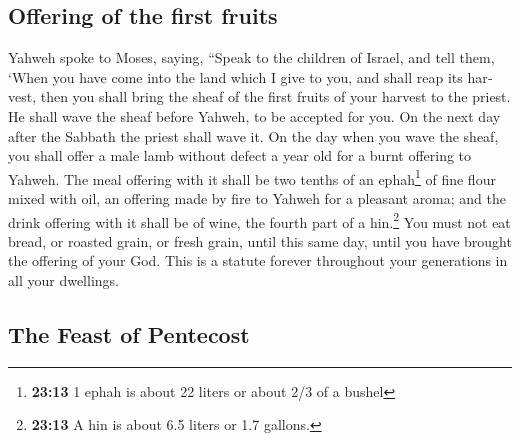 \begin{paracol}{2}
\begin{otherlanguage}{english}
\hypertarget{offering-of-the-first-fruits}{%
\subsection{Offering of the first
fruits}\label{offering-of-the-first-fruits}}

 Yahweh spoke to Moses, saying,  ``Speak to
the children of Israel, and tell them, `When you have come into the land
which I give to you, and shall reap its harvest, then you shall bring
the sheaf of the first fruits of your harvest to the priest.
 He shall wave the sheaf before Yahweh, to be accepted
for you. On the next day after the Sabbath the priest shall wave it.
 On the day when you wave the sheaf, you shall offer a
male lamb without defect a year old for a burnt offering to Yahweh.
 The meal offering with it shall be two tenths of an
ephah\footnote{\textbf{23:13} 1 ephah is about 22 liters or about 2/3 of
  a bushel} of fine flour mixed with oil, an offering made by fire to
Yahweh for a pleasant aroma; and the drink offering with it shall be of
wine, the fourth part of a hin.\footnote{\textbf{23:13} A hin is about
  6.5 liters or 1.7 gallons.}  You must not eat bread, or
roasted grain, or fresh grain, until this same day, until you have
brought the offering of your God. This is a statute forever throughout
your generations in all your dwellings.

\hypertarget{the-feast-of-pentecost}{%
\subsection{The Feast of Pentecost}\label{the-feast-of-pentecost}}


\end{otherlanguage}
\end{paracol}
